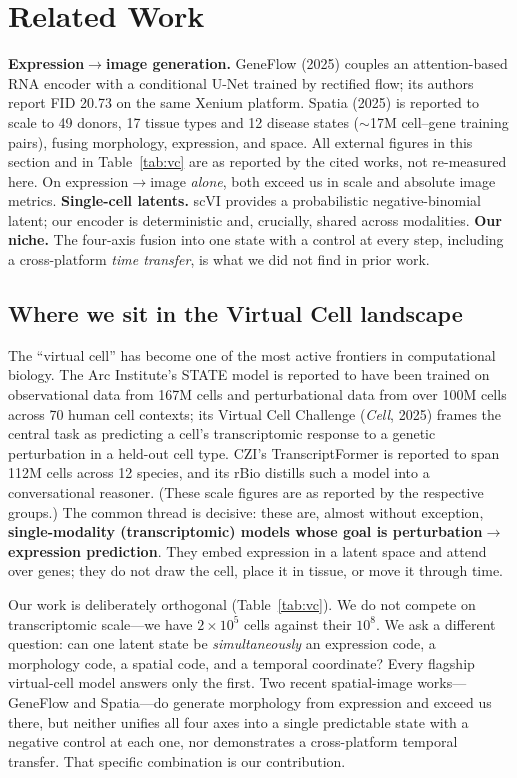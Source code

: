\documentclass[10pt,twocolumn]{article}
\begin{document}
\section{Related Work}
\textbf{Expression$\to$image generation.} GeneFlow (2025) couples an
attention-based RNA encoder with a conditional U-Net trained by rectified flow;
its authors report FID 20.73 on the same Xenium platform. Spatia (2025) is
reported to scale to 49 donors, 17 tissue types and 12 disease states
($\sim$17M cell--gene training pairs), fusing morphology, expression, and space.
All external figures in this section and in Table~\ref{tab:vc} are as reported
by the cited works, not re-measured here. On expression$\to$image \emph{alone},
both exceed us in scale and absolute image metrics.
\textbf{Single-cell latents.} scVI provides a probabilistic negative-binomial
latent; our encoder is deterministic and, crucially, shared across modalities.
\textbf{Our niche.} The four-axis fusion into one state with a control at every
step, including a cross-platform \emph{time transfer}, is what we did not find in
prior work.

\subsection{Where we sit in the Virtual Cell landscape}
The ``virtual cell'' has become one of the most active frontiers in
computational biology. The Arc Institute's STATE model is reported to have been
trained on observational data from 167M cells and perturbational data from over
100M cells across 70 human cell contexts; its Virtual Cell Challenge
(\emph{Cell}, 2025) frames the central task as predicting a cell's transcriptomic
response to a genetic perturbation in a held-out cell type. CZI's
TranscriptFormer is reported to span 112M cells across 12 species, and its rBio
distills such a model into a conversational reasoner. (These scale figures are
as reported by the respective groups.) The common thread is decisive: these are, almost
without exception, \textbf{single-modality (transcriptomic) models whose goal is
perturbation$\to$expression prediction}. They embed expression in a latent space
and attend over genes; they do not draw the cell, place it in tissue, or move it
through time.

Our work is deliberately orthogonal (Table~\ref{tab:vc}). We do not compete on
transcriptomic scale---we have $2\times10^5$ cells against their $10^8$. We ask a
different question: can one latent state be \emph{simultaneously} an expression
code, a morphology code, a spatial code, and a temporal coordinate? Every
flagship virtual-cell model answers only the first. Two recent spatial-image
works---GeneFlow and Spatia---do generate morphology from expression and exceed
us there, but neither unifies all four axes into a single predictable state with
a negative control at each one, nor demonstrates a cross-platform temporal
transfer. That specific combination is our contribution.
\end{document}

